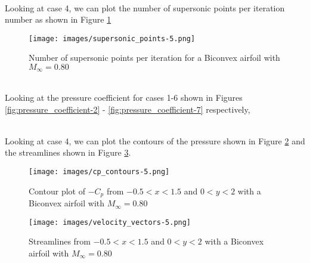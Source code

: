 \vspace{1cm}




\\

Looking at case 4, we can plot the number of supersonic points per iteration number as shown in Figure \ref{fig:supersonic_points-4}

\begin{figure}
    \centering
    \texttt{[image: images/supersonic\_points-5.png]}
    \caption{Number of supersonic points per iteration for a Biconvex airfoil with $M_\infty = 0.80$}
    \label{fig:supersonic_points-4}
\end{figure}

\vspace{1cm}




\\

Looking at the pressure coefficient for cases 1-6 shown in Figures \ref{fig:pressure_coefficient-2} - \ref{fig:pressure_coefficient-7} respectively, 

\vspace{1cm}



\\

Looking at case 4, we can plot the contours of the pressure shown in Figure \ref{fig:cp_contours-5} and the streamlines shown in Figure \ref{fig:velocity_vectors-5}.

\begin{figure}
    \centering
    \texttt{[image: images/cp\_contours-5.png]}
    \caption{Contour plot of $-C_p$ from $-0.5 < x < 1.5$ and $0 < y <2$ with a Biconvex airfoil with $M_\infty = 0.80$}
    \label{fig:cp_contours-5}
\end{figure}

\begin{figure}
    \centering
    \texttt{[image: images/velocity\_vectors-5.png]}
    \caption{Streamlines from $-0.5 < x < 1.5$ and $0 < y <2$ with a Biconvex airfoil with $M_\infty = 0.80$}
    \label{fig:velocity_vectors-5}
\end{figure}